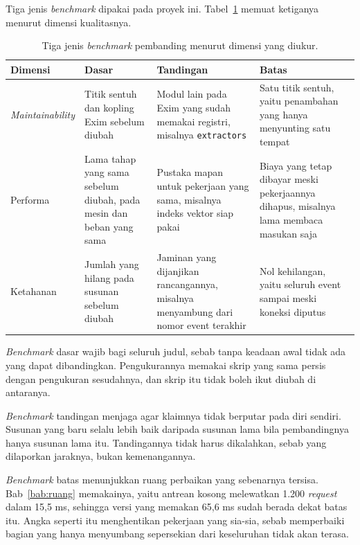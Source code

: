 Tiga jenis \textit{benchmark} dipakai pada proyek ini.
Tabel~\ref{tab:benchmark} memuat ketiganya menurut dimensi kualitasnya.

\begin{table}[htbp]
  \centering
  \caption{Tiga jenis \textit{benchmark} pembanding menurut dimensi yang diukur.}
  \label{tab:benchmark}
  \begin{tabularx}{\textwidth}{|l|X|X|X|}
    \hline
    \textbf{Dimensi} & \textbf{Dasar} & \textbf{Tandingan} & \textbf{Batas} \\
    \hline
    \textit{Maintainability} & Titik sentuh dan kopling Exim sebelum diubah & Modul lain pada Exim yang sudah memakai registri, misalnya \texttt{extractors} & Satu titik sentuh, yaitu penambahan yang hanya menyunting satu tempat \\
    \hline
    Performa & Lama tahap yang sama sebelum diubah, pada mesin dan beban yang sama & Pustaka mapan untuk pekerjaan yang sama, misalnya indeks vektor siap pakai & Biaya yang tetap dibayar meski pekerjaannya dihapus, misalnya lama membaca masukan saja \\
    \hline
    Ketahanan & Jumlah yang hilang pada susunan sebelum diubah & Jaminan yang dijanjikan rancangannya, misalnya menyambung dari nomor event terakhir & Nol kehilangan, yaitu seluruh event sampai meski koneksi diputus \\
    \hline
  \end{tabularx}
\end{table}

\textit{Benchmark} dasar wajib bagi seluruh judul, sebab tanpa keadaan awal
tidak ada yang dapat dibandingkan. Pengukurannya memakai skrip yang sama persis
dengan pengukuran sesudahnya, dan skrip itu tidak boleh ikut diubah di
antaranya.

\textit{Benchmark} tandingan menjaga agar klaimnya tidak berputar pada diri
sendiri. Susunan yang baru selalu lebih baik daripada susunan lama bila
pembandingnya hanya susunan lama itu. Tandingannya tidak harus dikalahkan,
sebab yang dilaporkan jaraknya, bukan kemenangannya.

\textit{Benchmark} batas menunjukkan ruang perbaikan yang sebenarnya tersisa.
Bab~\ref{bab:ruang} memakainya, yaitu antrean kosong melewatkan 1.200
\textit{request} dalam 15,5 ms, sehingga versi yang memakan 65,6 ms sudah
berada dekat batas itu. Angka seperti itu menghentikan pekerjaan yang sia-sia,
sebab memperbaiki bagian yang hanya menyumbang sepersekian dari keseluruhan
tidak akan terasa.

